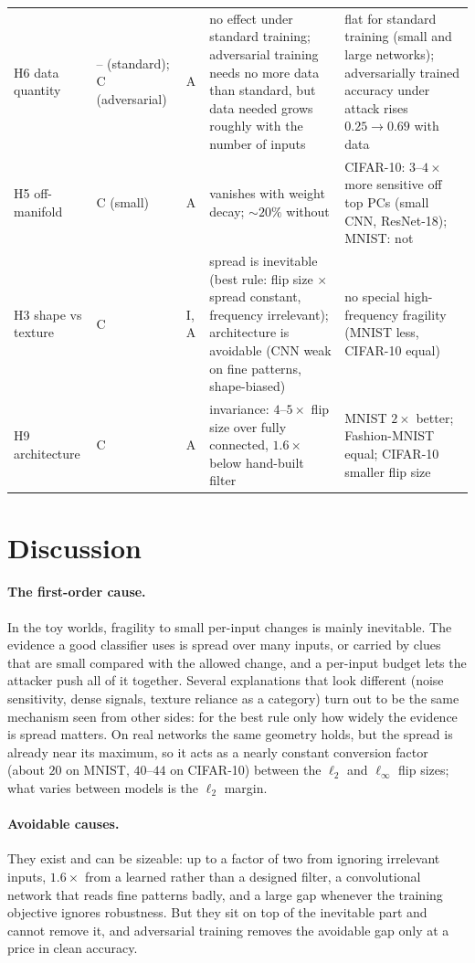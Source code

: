 \documentclass[11pt]{article}
\begin{document}
\begin{table}[H]
\begin{tabular}{p{2.3cm}p{1.0cm}p{1.0cm}p{4.7cm}p{4.7cm}}
H6 data quantity & -- (standard); C (adversarial) & A & no effect under standard training; adversarial training needs no more data than standard, but data needed grows roughly with the number of inputs & flat for standard training (small and large networks); adversarially trained accuracy under attack rises $0.25\to0.69$ with data \\
H5 off-manifold & C (small) & A & vanishes with weight decay; $\sim20\%$ without & CIFAR-10: $3$--$4\times$ more sensitive off top PCs (small CNN, ResNet-18); MNIST: not \\
H3 shape vs texture & C & I, A & spread is inevitable (best rule: flip size $\times$ spread constant, frequency irrelevant); architecture is avoidable (CNN weak on fine patterns, shape-biased) & no special high-frequency fragility (MNIST less, CIFAR-10 equal) \\
H9 architecture & C & A & invariance: $4$--$5\times$ flip size over fully connected, $1.6\times$ below hand-built filter & MNIST $2\times$ better; Fashion-MNIST equal; CIFAR-10 smaller flip size \\
\bottomrule
\end{tabular}
\end{table}

\section{Discussion}

\paragraph{The first-order cause.} In the toy worlds, fragility to small per-input changes is mainly inevitable. The evidence a good classifier uses is spread over many inputs, or carried by clues that are small compared with the allowed change, and a per-input budget lets the attacker push all of it together. Several explanations that look different (noise sensitivity, dense signals, texture reliance as a category) turn out to be the same mechanism seen from other sides: for the best rule only how widely the evidence is spread matters. On real networks the same geometry holds, but the spread is already near its maximum, so it acts as a nearly constant conversion factor (about $20$ on MNIST, $40$--$44$ on CIFAR-10) between the $\ell_2$ and $\ell_\infty$ flip sizes; what varies between models is the $\ell_2$ margin.

\paragraph{Avoidable causes.} They exist and can be sizeable: up to a factor of two from ignoring irrelevant inputs, $1.6\times$ from a learned rather than a designed filter, a convolutional network that reads fine patterns badly, and a large gap whenever the training objective ignores robustness. But they sit on top of the inevitable part and cannot remove it, and adversarial training removes the avoidable gap only at a price in clean accuracy.
\end{document}
